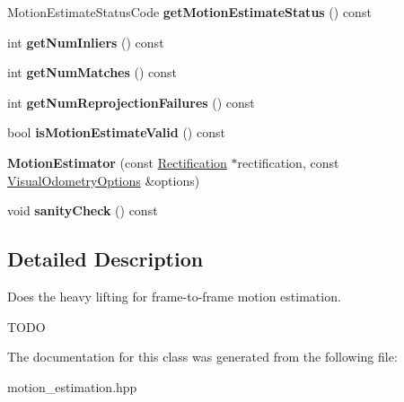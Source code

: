 \begin{DoxyCompactItemize}
\item 
\hypertarget{classfovis_1_1MotionEstimator_ae03356861ab491be0d5e608c8cdd33a2}{
MotionEstimateStatusCode {\bfseries getMotionEstimateStatus} () const }
\label{classfovis_1_1MotionEstimator_ae03356861ab491be0d5e608c8cdd33a2}

\item 
\hypertarget{classfovis_1_1MotionEstimator_adf826f377022c6213c92026357b3e5f7}{
int {\bfseries getNumInliers} () const }
\label{classfovis_1_1MotionEstimator_adf826f377022c6213c92026357b3e5f7}

\item 
\hypertarget{classfovis_1_1MotionEstimator_a5ce986836e2b931304b72c06d3368a68}{
int {\bfseries getNumMatches} () const }
\label{classfovis_1_1MotionEstimator_a5ce986836e2b931304b72c06d3368a68}

\item 
\hypertarget{classfovis_1_1MotionEstimator_a73a5d5fbe2e0f32f81aba566ad082860}{
int {\bfseries getNumReprojectionFailures} () const }
\label{classfovis_1_1MotionEstimator_a73a5d5fbe2e0f32f81aba566ad082860}

\item 
\hypertarget{classfovis_1_1MotionEstimator_a025c494156c68a7e1fc986ab283e6421}{
bool {\bfseries isMotionEstimateValid} () const }
\label{classfovis_1_1MotionEstimator_a025c494156c68a7e1fc986ab283e6421}

\item 
\hypertarget{classfovis_1_1MotionEstimator_adabd55c2d38a6a6e0546db780bc76f43}{
{\bfseries MotionEstimator} (const \hyperlink{classfovis_1_1Rectification}{Rectification} $\ast$rectification, const \hyperlink{group__FovisCore_ga113578b67d3e37bc78f1fffd8440e1ff}{VisualOdometryOptions} \&options)}
\label{classfovis_1_1MotionEstimator_adabd55c2d38a6a6e0546db780bc76f43}

\item 
\hypertarget{classfovis_1_1MotionEstimator_a892c8032392efdef960a30a2e8cd817c}{
void {\bfseries sanityCheck} () const }
\label{classfovis_1_1MotionEstimator_a892c8032392efdef960a30a2e8cd817c}

\end{DoxyCompactItemize}


\subsection{Detailed Description}
Does the heavy lifting for frame-\/to-\/frame motion estimation. 

TODO 

The documentation for this class was generated from the following file:\begin{DoxyCompactItemize}
\item 
motion\_\-estimation.hpp\end{DoxyCompactItemize}
